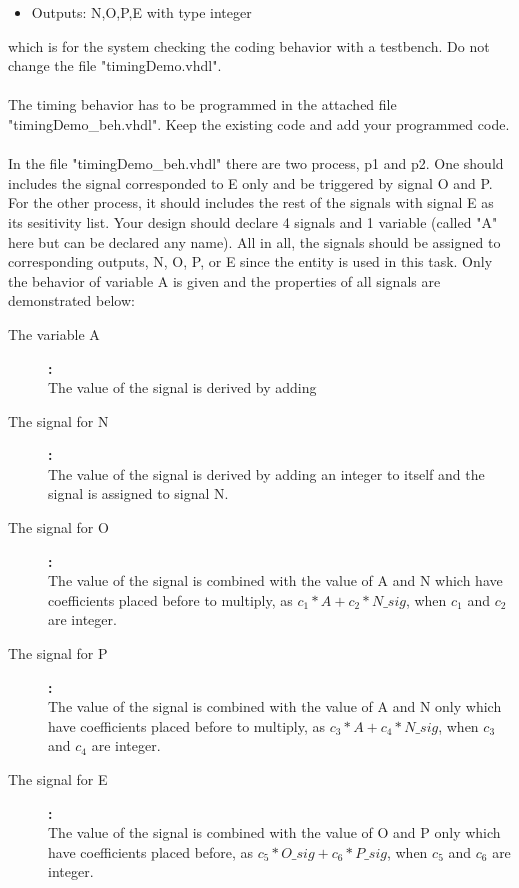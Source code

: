\documentclass[a4paper,12pt]{article}
\begin{document}
\begin{itemize}
\item Outputs: N,O,P,E with type integer
\end{itemize}
which is for the system checking the coding behavior with a testbench. Do not change the file "timingDemo.vhdl".
\\
\\
The timing behavior has to be programmed in the attached file "timingDemo\_beh.vhdl".  Keep the existing code and add your programmed code.
\\
\\
In the file "timingDemo\_beh.vhdl" there are two process, p1 and p2. One should includes the signal corresponded to E only and be triggered by signal O and P. For the other process, it should includes the rest of the signals with signal E as its sesitivity list. Your design should declare 4 signals and 1 variable (called "A" here but can be declared any name). All in all, the signals should be assigned to corresponding outputs, N, O, P, or E since the entity is used in this task. Only the behavior of variable A is given and the properties of all signals are demonstrated below:
\begin{description}
\item [The variable A]\textbf{:} \\
The value of the signal is derived by adding %

\item [The signal for N]\textbf{:} \\
The value of the signal is derived by adding an integer to itself and the signal is assigned to signal N.   

\item [The signal for O]\textbf{:} \\
The value of the signal is combined with the value of A and N which have coefficients placed before to multiply, as $c_{1} * A + c_{2} * N\_sig$, when $c_{1}$ and $c_{2}$ are integer. 

\item [The signal for P]\textbf{:} \\
The value of the signal is combined with the value of A and N only which have coefficients placed before to multiply, as $c_{3} * A + c_{4} * N\_sig$, when $c_{3}$ and $c_{4}$ are integer. 

\item [The signal for E]\textbf{:} \\
The value of the signal is combined with the value of O and P only which have coefficients placed before, as $c_{5} * O\_sig + c_{6} * P\_sig$, when $c_{5}$ and $c_{6}$ are integer.
\\ 
\end{description}
\end{document}
